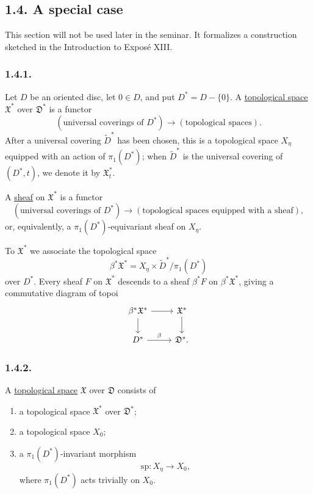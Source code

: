 \subsection*{1.4. A special case}

This section will not be used later in the seminar.  It formalizes a
construction sketched in the Introduction to Expos\'e XIII.

\subsubsection*{1.4.1.}
Let $D$ be an oriented disc, let $0\in D$, and put
$D^*=D-\{0\}$.  A \underline{topological space} $\mathfrak X^*$ over
$\mathfrak D^*$ is a functor
\[
(\text{universal coverings of }D^*)
\longrightarrow(\text{topological spaces}).
\]
After a universal covering $\widetilde D^*$ has been chosen, this is
a topological space $X_\eta$ equipped with an action of
$\pi_1(D^*)$; when $\widetilde D^*$ is the universal covering of
$(D^*,t)$, we denote it by $\mathfrak X_t^*$.

A \underline{sheaf} on $\mathfrak X^*$ is a functor
\[
(\text{universal coverings of }D^*)
\longrightarrow
(\text{topological spaces equipped with a sheaf}),
\]
or, equivalently, a $\pi_1(D^*)$-equivariant sheaf on $X_\eta$.

To $\mathfrak X^*$ we associate the topological space
\[
\beta^*\mathfrak X^*
=X_\eta\times\widetilde D^*/\pi_1(D^*)
\]
over $D^*$.  Every sheaf $F$ on $\mathfrak X^*$ descends to a sheaf
$\beta^*F$ on $\beta^*\mathfrak X^*$, giving a commutative diagram of
topoi
\[
\begin{tikzcd}
\beta^*\mathfrak X^* \arrow[r] \arrow[d]
  & \mathfrak X^* \arrow[d] \\
D^* \arrow[r, "\beta"]
  & \mathfrak D^*.
\end{tikzcd}
\]

\subsubsection*{1.4.2.}
A \underline{topological space} $\mathfrak X$ over $\mathfrak D$
consists of
\begin{enumerate}[label=(\alph*),leftmargin=2.7em]
\item a topological space $\mathfrak X^*$ over $\mathfrak D^*$;
\item a topological space $X_0$;
\item a $\pi_1(D^*)$-invariant morphism
\[
\mathrm{sp}:X_\eta\longrightarrow X_0,
\]
where $\pi_1(D^*)$ acts trivially on $X_0$.
\end{enumerate}

